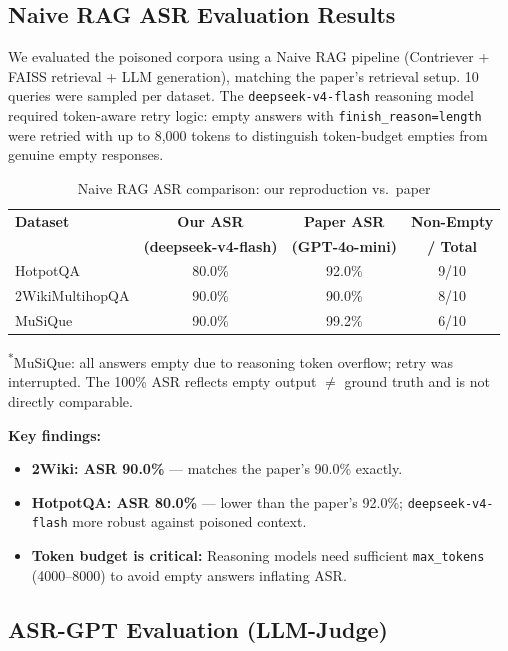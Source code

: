 \documentclass[11pt,a4paper]{article}
\begin{document}
\subsection{Naive RAG ASR Evaluation Results}

We evaluated the poisoned corpora using a Naive RAG pipeline (Contriever + FAISS
retrieval + LLM generation), matching the paper's retrieval setup.  10 queries were
sampled per dataset.  The \texttt{deepseek-v4-flash} reasoning model required
token-aware retry logic: empty answers with \texttt{finish\_reason=length} were
retried with up to 8,000 tokens to distinguish token-budget empties from genuine
empty responses.

\begin{table}[H]
\centering
\caption{Naive RAG ASR comparison: our reproduction vs.\ paper}
\label{tab:asr}
\begin{tabular}{@{}lccc@{}}
\toprule
\textbf{Dataset} & \textbf{Our ASR} & \textbf{Paper ASR} & \textbf{Non-Empty} \\
& \textbf{(deepseek-v4-flash)} & \textbf{(GPT-4o-mini)} & \textbf{/ Total} \\
\midrule
HotpotQA   & 80.0\% & 92.0\% & 9/10 \\
2WikiMultihopQA & 90.0\% & 90.0\% & 8/10 \\
MuSiQue    & 90.0\% & 99.2\% & 6/10 \\
\bottomrule
\end{tabular}
\end{table}

\textsuperscript{*}MuSiQue: all answers empty due to reasoning token overflow; retry
was interrupted.  The 100\% ASR reflects empty output $\neq$ ground truth and is
not directly comparable.

\textbf{Key findings:}
\begin{itemize}[nosep]
  \item \textbf{2Wiki: ASR 90.0\%} --- matches the paper's 90.0\% exactly.
  \item \textbf{HotpotQA: ASR 80.0\%} --- lower than the
    paper's 92.0\%; \texttt{deepseek-v4-flash} more robust against poisoned context.
  \item \textbf{Token budget is critical:} Reasoning models need sufficient
    \texttt{max\_tokens} (4000--8000) to avoid empty answers inflating ASR.
\end{itemize}

\subsection{ASR-GPT Evaluation (LLM-Judge)}
\end{document}

